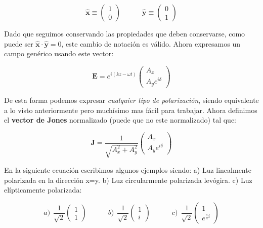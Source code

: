 \documentclass[12pt,a4paper]{article}
\newcommand{\tquad}{\quad \quad \quad}
\newcommand{\En}{\mathbf{E}}
\newcommand{\Jn}{\mathbf{J}}
\newcommand{\hnx}{\hat{\mathbf{x}}}
\newcommand{\hny}{\hat{\mathbf{y}}}
\numberwithin{equation}{section}
\numberwithin{figure}{section}
\begin{document}
\begin{equation}
\hnx \equiv \begin{pmatrix}
1 \\
0
\end{pmatrix} \tquad
\hny \equiv \begin{pmatrix}
0 \\
1
\end{pmatrix}
\end{equation}

Dado que seguimos conservando las propiedades que deben conservarse, como puede ser $\hnx \cdot \hny = 0$, este cambio de notación es válido. Ahora expresamos un campo genérico usando este vector:

\begin{equation}
\En = e^{i(kz-\omega t)} \begin{pmatrix}
A_x \\
A_y e^{i \delta}
\end{pmatrix}
\end{equation}

De esta forma podemos expresar \textit{cualquier tipo de polarización}, siendo equivalente a lo visto anteriormente pero muchísimo mas fácil para trabajar. Ahora definimos el \textbf{vector de Jones} normalizado (puede que no este normalizado) tal que:

\begin{equation}
\Jn = \dfrac{1}{\sqrt{A_x^2 + A_y^2}} \begin{pmatrix}
A_x \\
A_y e^{i \delta}
\end{pmatrix}
\end{equation}

En la siguiente ecuación escribimos algunos ejemplos siendo: a) Luz linealmente polarizada en la dirección x=y. b) Luz circularmente polarizada levógira. c) Luz elípticamente polarizada:

\begin{equation}
a) \ \  \frac{1}{\sqrt{2}}
\begin{pmatrix}
1 \\
1 
\end{pmatrix} \tquad b) \ \  \frac{1}{\sqrt{2}} 
\begin{pmatrix}
1 \\
i
\end{pmatrix} \tquad c) \ \ \frac{1}{\sqrt{2}}  
\begin{pmatrix}
1 \\
e^{\frac{\pi}{4} i}
\end{pmatrix}
\end{equation}
\end{document}
